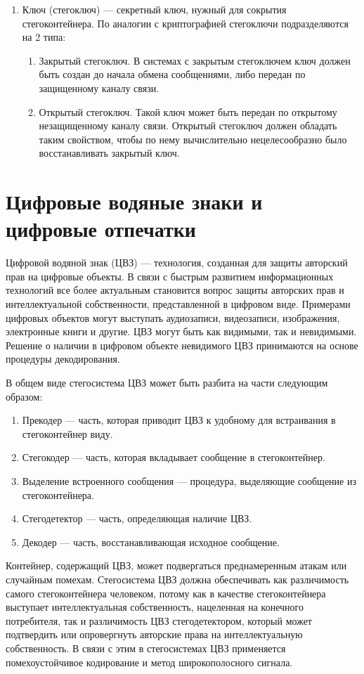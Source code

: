 \begin{enumerate}
    \item Ключ (стегоключ) --- секретный ключ, нужный для сокрытия стегоконтейнера.
    По аналогии с криптографией стегоключи подразделяются на 2 типа:
    \begin{enumerate}
        \item Закрытый стегоключ.
        В системах с закрытым стегоключем ключ должен быть создан до начала обмена сообщениями,
        либо передан по защищенному каналу связи.
        \item Открытый стегоключ. Такой ключ может быть передан по открытому незащищенному каналу связи.
        Открытый стегоключ должен обладать таким свойством, чтобы по нему вычислительно нецелесообразно
        было восстанавливать закрытый ключ.
    \end{enumerate}
\end{enumerate}

\section{Цифровые водяные знаки и цифровые отпечатки}

Цифровой водяной знак (ЦВЗ) --- технология, созданная для защиты авторский прав на цифровые объекты.
В связи с быстрым развитием информационных технологий все более актуальным становится
вопрос защиты авторских прав и интеллектуальной собственности, представленной в цифровом виде.
Примерами цифровых объектов могут выступать аудиозаписи, видеозаписи, изображения, электронные книги и другие. 
ЦВЗ могут быть как видимыми, так и невидимыми. Решение о наличии в цифровом объекте невидимого ЦВЗ принимаются
на основе процедуры декодирования.

В общем виде стегосистема ЦВЗ может быть разбита на части следующим образом:
\begin{enumerate}
    \item Прекодер --- часть, которая приводит ЦВЗ к удобному для встраивания в стегоконтейнер виду.
    \item Стегокодер --- часть, которая вкладывает сообщение в стегоконтейнер.
    \item Выделение встроенного сообщения --- процедура, выделяющие сообщение из стегоконтейнера.
    \item Стегодетектор --- часть, определяющая наличие ЦВЗ.
    \item Декодер --- часть, восстанавливающая исходное сообщение.
\end{enumerate}

Контейнер, содержащий ЦВЗ, может подвергаться преднамеренным атакам или случайным помехам.
Стегосистема ЦВЗ должна обеспечивать как различимость самого стегоконтейнера человеком,
потому как в качестве стегоконтейнера выступает интеллектуальная собственность,
нацеленная на конечного потребителя, так и различимость ЦВЗ стегодетектором,
который может подтвердить или опровергнуть авторские права на интеллектуальную собственность.
В связи с этим в стегосистемах ЦВЗ применяется помехоустойчивое кодирование и метод широкополосного сигнала.

